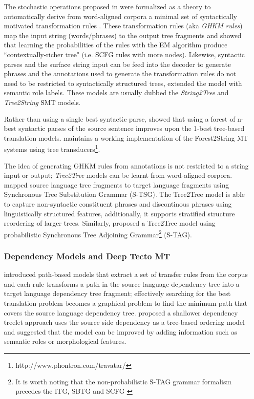 The stochastic operations proposed in \citeauthor{yamada2001syntax} were formalized as a theory to automatically derive from word-aligned corpora a minimal set of syntactically motivated transformation rules \citep{ghkm2004}. These transformation rules (aka \emph{GHKM rules}) map the input string (words/phrases) to the output tree fragments and \cite{galley2006scalable} showed that learning the probabilities of the rules with the EM algorithm produce ``contextually-richer tree" (i.e. SCFG rules with more nodes). Likewise, syntactic parses and the surface string input can be feed into the decoder to generate phrases \citep{Huang2006T2S} and the annotations used to generate the transformation rules do not need to be restricted to syntactically structured trees, \cite{liu2008improved} extended the model with semantic role labels. These models are usually dubbed the \emph{String2Tree} and \emph{Tree2String} SMT models.

Rather than using a single best syntactic parse, \cite{mi2008forest} showed that using a forest of n-best syntactic parses of the source sentence improves upon the 1-best tree-based translation models. \cite{neubig13travatar} maintains a working implementation of the Forest2String MT systems using tree transducers\footnote{http://www.phontron.com/travatar/}.

The idea of generating GHKM rules from annotations is not restricted to a string input or output; \emph{Tree2Tree} models can be learnt from word-aligned corpora. \cite{zhangt2t} mapped source language tree fragments to target language fragments using Synchronous Tree Substitution Grammar (S-TSG). The Tree2Tree model is able to capture non-syntactic constituent phrases and discontinous phrases using linguistically structured features, additionally, it supports stratified structure reordering of larger trees. Similarly, \cite{shieber2007probabilistic} proposed a Tree2Tree model using probabilistic Synchronous Tree Adjoining Grammar\footnote{It is worth noting that the non-probabilistic S-TAG grammar formalism precedes the ITG, SBTG and SCFG \citep{shieber1990synchronous}} (S-TAG).

\subsubsection{Dependency Models and Deep Tecto MT}
 
\cite{lin2004path} introduced path-based models that extract a set of transfer rules from the corpus and each rule transforms a path in the source language dependency tree into a target language dependency tree fragment; effectively searching for the best translation problem becomes a graphical problem to find the minimum path that covers the source language dependency tree. \cite{menezes2005dependency} proposed a shallower dependency treelet approach uses the source side dependency as a tree-based ordering model and suggested that the model can be improved by adding information such as semantic roles or morphological features. 

